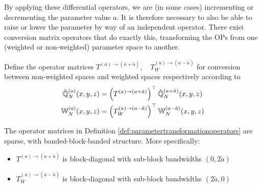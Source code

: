\documentclass[11pt, oneside]{article}   	%
\begin{document}
By applying these differential operators, we are (in some cases) incrementing or decrementing the parameter value $a$. It is therefore necessary to also be able to raise or lower the parameter by way of an independent operator. There exist conversion matrix operators that do exactly this, transforming the OPs from one (weighted or non-weighted) parameter space to another.
\begin{definition}\label{def:parametertransformationoperators}
Define the operator matrices $T^{(a)\to(a+\tilde a)}, \quad T_W^{(a)\to(a-\tilde a)}$ for conversion between non-weighted spaces and weighted spaces respectively according to
\begin{align*}
	{\mathbb{\tilde Q}}^{(a)}_{N}(x,y,z) &= \Big(T^{(a)\to(a+\tilde a)} \Big)^\top \: {\mathbb{\tilde Q}}_{N}^{(a+\tilde a)}(x,y,z) \\
	\mathbb{W}_N^{(a)}(x,y,z) &= \Big(T_W^{(a)\to(a-\tilde a)} \Big)^\top \: \mathbb{W}_N^{(a-\tilde a)}(x,y,z)
\end{align*}
\end{definition}

\begin{lemma}\label{lemma:sparsityofparametertransformationoperators}
The operator matrices in Definition \ref{def:parametertransformationoperators} are sparse, with banded-block-banded structure. More specifically:
\begin{itemize}
	\item $T^{(a)\to(a+\tilde a)}$ is block-diagonal with sub-block bandwidths $(0,2\tilde a)$
	\item $T_W^{(a)\to(a-\tilde a)}$ is block-diagonal with sub-block bandwidths $(2\tilde a, 0)$
\end{itemize}
\end{lemma}
\end{document}
